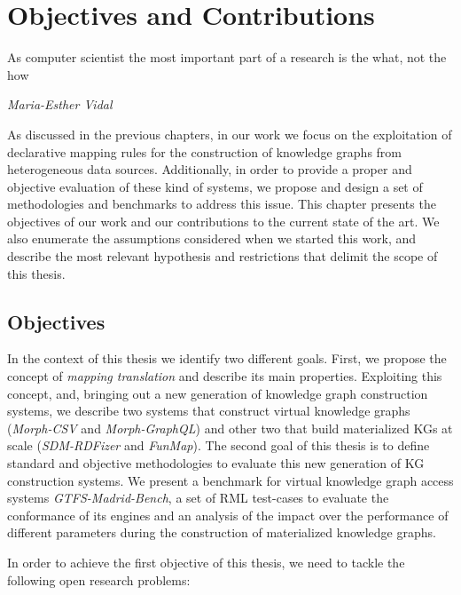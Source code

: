 \chapter{Objectives and Contributions}

\epigraph{As computer scientist the most important part of a research is the what, not the how}{\textit{Maria-Esther Vidal}}

\label{chap:objectives}
As discussed in the previous chapters, in our work we focus on the exploitation of declarative mapping rules for the construction of knowledge graphs from heterogeneous data sources. Additionally, in order to provide a proper and objective evaluation of these kind of systems, we propose and design a set of methodologies and benchmarks to address this issue. This chapter presents the objectives of our work and our contributions to the current state of the art. We also enumerate the assumptions considered when we started this work, and describe the most relevant hypothesis and restrictions that delimit the scope of this thesis.

\section{Objectives}
In the context of this thesis we identify two different goals. First, we propose the concept of \textit{mapping translation} and describe its main properties. Exploiting this concept, and, bringing out a new generation of knowledge graph construction systems, we describe two systems that construct virtual knowledge graphs (\textit{Morph-CSV} and \textit{Morph-GraphQL}) and other two that build materialized KGs at scale (\textit{SDM-RDFizer} and \textit{FunMap}). The second goal of this thesis is to define standard and objective methodologies to evaluate this new generation of KG construction systems. We present a benchmark for virtual knowledge graph access systems \textit{GTFS-Madrid-Bench}, a set of RML test-cases to evaluate the conformance of its engines and an analysis of the impact over the performance of different parameters during the construction of materialized knowledge graphs.

In order to achieve the first objective of this thesis, we need to tackle the following open research problems:


